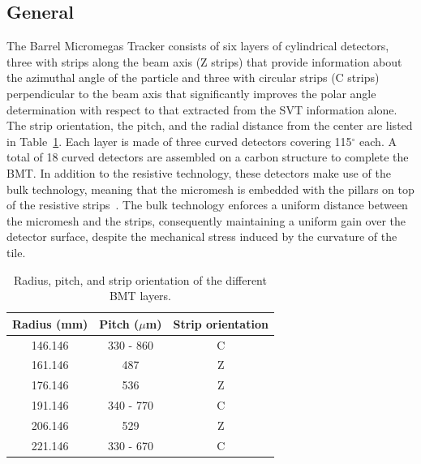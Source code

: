 \subsection{General}

The Barrel Micromegas Tracker consists of six layers of cylindrical detectors, three with strips along the beam axis (Z strips)
that provide information about the azimuthal angle of the particle and three with circular strips (C strips) perpendicular to the
beam axis that significantly improves the polar angle determination with respect to that extracted from the SVT information
alone. The strip orientation, the pitch, and the radial distance from the center are listed in 
Table~\ref{tab:bmt_strips}. Each layer is made of three curved detectors covering 115$^\circ$ each. A total of 18 
curved detectors are assembled on a carbon structure to complete the BMT. In addition to the resistive technology, 
these detectors make use of the bulk technology, meaning that the micromesh is embedded with the pillars on top of the 
resistive strips~\cite{GIOMATARIS2006405}. The bulk technology enforces a uniform distance between the micromesh and the 
strips, consequently maintaining a uniform gain over the detector surface, despite the mechanical stress induced by the 
curvature of the tile.

\begin{table}
    \centering
    \begin{tabular}{|c|c|c|}
    \hline
    Radius (mm) & Pitch ($\mu$m) & Strip orientation \\
    \hline
    146.146 & 330 - 860 & C \\
    161.146 & 487 & Z \\
    176.146 & 536 & Z \\
    191.146 & 340 - 770 & C \\
    206.146 & 529 & Z \\
    221.146 & 330 - 670 & C \\
    \hline
    \end{tabular}
    \caption{Radius, pitch, and strip orientation of the different BMT layers.}
    \label{tab:bmt_strips}
\end{table}

